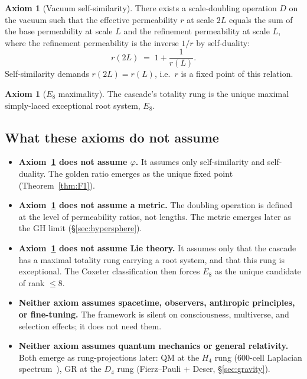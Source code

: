 \documentclass[11pt]{article}
\theoremstyle{plain}
\theoremstyle{definition}
\newtheorem{axiom}[theorem]{Axiom}
\theoremstyle{remark}
\begin{document}
\begin{axiom}[Vacuum self-similarity]\label{ax:A1}
There exists a scale-doubling operation $D$ on the vacuum such that the effective permeability $r$ at scale $2L$ equals the sum of the base permeability at scale $L$ and the refinement permeability at scale $L$, where the refinement permeability is the inverse $1/r$ by self-duality:
\[
  r(2L) \;=\; 1 + \frac{1}{r(L)}.
\]
Self-similarity demands $r(2L) = r(L)$, i.e.\ $r$ is a fixed point of this relation.
\end{axiom}

\begin{axiom}[$E_8$ maximality]\label{ax:A2}
The cascade's totality rung is the unique maximal simply-laced exceptional root system, $E_8$.
\end{axiom}

\subsection{What these axioms do not assume}

\begin{itemize}[leftmargin=2em]
\item \textbf{Axiom~\ref{ax:A1} does not assume $\varphi$.} It assumes only self-similarity and self-duality. The golden ratio emerges as the unique fixed point (Theorem~\ref{thm:F1}).

\item \textbf{Axiom~\ref{ax:A1} does not assume a metric.} The doubling operation is defined at the level of permeability ratios, not lengths. The metric emerges later as the GH limit (\S\ref{sec:hypersphere}).

\item \textbf{Axiom~\ref{ax:A2} does not assume Lie theory.} It assumes only that the cascade has a maximal totality rung carrying a root system, and that this rung is exceptional. The Coxeter classification then forces $E_8$ as the unique candidate of rank $\le 8$.

\item \textbf{Neither axiom assumes spacetime, observers, anthropic principles, or fine-tuning.} The framework is silent on consciousness, multiverse, and selection effects; it does not need them.

\item \textbf{Neither axiom assumes quantum mechanics or general relativity.} Both emerge as rung-projections later: QM at the $H_4$ rung (600-cell Laplacian spectrum~\citep{SmartV}), GR at the $D_4$ rung (Fierz--Pauli + Deser, \S\ref{sec:gravity}).
\end{itemize}
\end{document}
